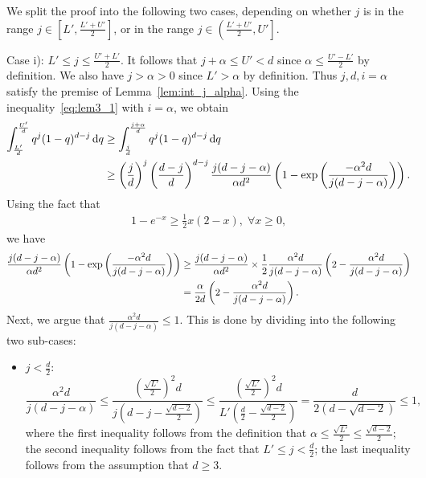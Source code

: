 \documentclass[onecolumn,letterpaper]{IEEEtran}
\newcommand{\cp}{{q}}
\newcommand{\up}{{U}}
\newcommand{\lw}{{L}}
\newcommand*{\dif}{{\,\mathrm{d}}}
\newcommand{\ap}{{\alpha}}
\begin{document}
\begin{IEEEproof}
We split the proof into the following two cases, depending on whether $j$ is in the range $j\in \left[\lw',\frac {\lw'+\up'} {2} \right]$, or in the range $j\in \left(\frac {\lw'+\up'} {2} ,\up'\right]$.


Case i): $\lw' \le j \le \frac{\up'+\lw'}{2}$. It follows that $j+\ap\leq \up'<d$ since $\ap\leq \frac{\up'-\lw'}{2}$ by definition. We also have $j>\ap>0$ since $\lw'>\ap$ by definition. Thus $j,d,i=\ap$ satisfy the premise of Lemma~\ref{lem:int_j_alpha}. Using the inequality~\eqref{eq:lem3_1} with $i=\ap$, we obtain 
\begin{align}
\label{eq:upint:1b1}
\int_{\frac {\lw'}{d}}^{\frac {\up'}{d}} \cp^j (1-\cp)^{d-j} \dif \cp &\ge \int_{\frac j d}^{\frac {j+\ap}{d}} \cp^j (1-\cp)^{d-j} \dif \cp \notag \\
&\ge \left( \frac{j}{d} \right)^j \left( \frac{d-j}{d} \right)^{d-j} \frac{j(d-j-\ap)}{\ap d^2} \left( 1 - \exp\left( \frac{-\ap^2 d }{j (d-j-\ap)} \right) \right).
\end{align}
Using the fact that  
\begin{align}
\label{eq:1-e-x:bound}
1-e^{-x} \geq \frac{1}{2} x(2-x),\;\forall x\ge 0,
\end{align} 
we have 
\begin{align}
\label{eq:upint:1b2}
\frac{j(d-j-\ap)}{\ap d^2} \left( 1 - \exp\left( \frac{- \ap^2 d }{j (d-j-\ap)} \right) \right) &\ge \frac{j(d-j-\ap)}{\ap d^2} \times \frac{1}{2} \frac{\ap^2 d}{j(d-j-\ap)} \left(2 - \frac{\ap^2 d}{j(d-j-\ap)}\right) \notag\\ 
&= \frac{\ap}{2d} \left(2 - \frac{ \ap^2 d}{j(d-j-\ap)}\right).
\end{align}
Next, we argue that $\frac{\ap^2 d}{j(d-j-\ap)}\leq 1$. This is done by dividing into the following two sub-cases: 
\begin{itemize}
    \item \underline{$j < \frac{d}{2}$}: 
\begin{equation*}
\frac{\ap^2  d}{j(d-j-\ap)} \leq \frac{\left(\frac{\sqrt{\lw'}}{2}\right)^2 d}{j\left(d-j-\frac{\sqrt{d-2}}{2}\right)} \leq \frac{\left(\frac{\sqrt{\lw'}}{2}\right)^2 d }{\lw'\left(\frac{d}{2} - \frac{\sqrt{d-2}}{2}\right)} = \frac{d}{2\left(d-\sqrt{d-2}\right)} \le 1,
\end{equation*}
where the first inequality follows from the  definition that $\ap \leq \frac{\sqrt{\lw'}}{2} \leq \frac{\sqrt{d-2}}{2}$; the second inequality follows from the fact that $\lw' \leq j < \frac{d}{2}$; the last inequality follows from the assumption that $d\geq 3$. 

\end{itemize}
\end{IEEEproof}
\end{document}
